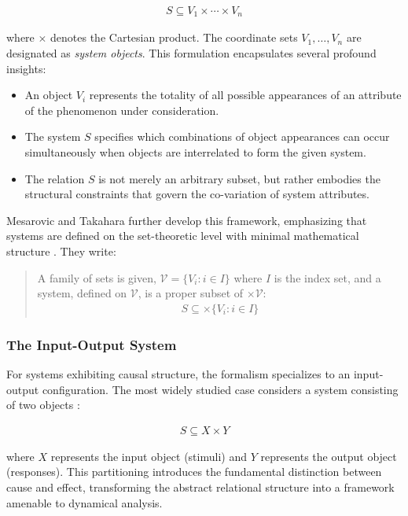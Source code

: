 \begin{align*}
S \subseteq V_1 \times \cdots \times V_n
\end{align*}

where $\times$ denotes the Cartesian product. The coordinate sets $V_1, \ldots, V_n$ are designated as \emph{system objects}. This formulation encapsulates several profound insights:

\begin{itemize}
\item An object $V_i$ represents the totality of all possible appearances of an attribute of the phenomenon under consideration.
\item The system $S$ specifies which combinations of object appearances can occur simultaneously when objects are interrelated to form the given system.
\item The relation $S$ is not merely an arbitrary subset, but rather embodies the structural constraints that govern the co-variation of system attributes.
\end{itemize}

Mesarovic and Takahara further develop this framework, emphasizing that systems are defined on the set-theoretic level with minimal mathematical structure \citep{mesarovic1975mathematical}. They write:

\begin{quote}
A family of sets is given, $\mathcal{V} = \{V_i : i \in I\}$ where $I$ is the index set, and a system, defined on $\mathcal{V}$, is a proper subset of $\times \mathcal{V}$:
\begin{align*}
S \subseteq \times \{V_i : i \in I\}
\end{align*}
\end{quote}

\subsubsection{The Input-Output System}

For systems exhibiting causal structure, the formalism specializes to an input-output configuration. The most widely studied case considers a system consisting of two objects \citep{mesarovic1975mathematical}:

\begin{align*}
S \subseteq X \times Y
\end{align*}

where $X$ represents the input object (stimuli) and $Y$ represents the output object (responses). This partitioning introduces the fundamental distinction between cause and effect, transforming the abstract relational structure into a framework amenable to dynamical analysis.

